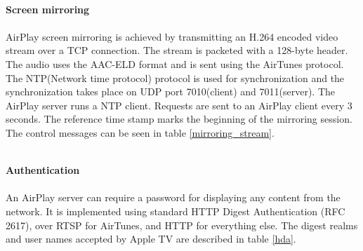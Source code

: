 \\
\textbf{Screen mirroring} \\
\\ 
AirPlay screen mirroring is achieved by transmitting an H.264 encoded video stream 
over a TCP connection. The stream is packeted with a 128-byte header. The 
audio uses the AAC-ELD format and is sent using the AirTunes protocol. 
The NTP(Network time protocol) protocol is used for synchronization and the synchronization 
takes place on UDP port 7010(client) and 7011(server). The 
AirPlay server runs a NTP client. Requests are sent to an AirPlay client every 3 
seconds. The reference time stamp marks the beginning of the 
mirroring session.  The control messages can be seen in table 
\ref{mirroring_stream}. \\
\begin{table}[htb] 
\caption{AirPlay Mirroring Control HTTP requests \label{mirroring_stream}} 
\begin{center} 
\end{center} 
\end{table} 
\\
\textbf{Authentication} \\ 
\\
An AirPlay server can require a password for displaying any content from the 
network. It is implemented using standard HTTP Digest Authentication (RFC 2617), 
over RTSP for AirTunes, and HTTP for everything else. The digest realms and 
user names accepted by Apple TV are described in table \ref{hda}. 
\begin{table}[htb] 
\caption{AirPlay HTTP Digest Authentication \label{hda}} 
\begin{center} 
\end{center} 
\end{table} 

